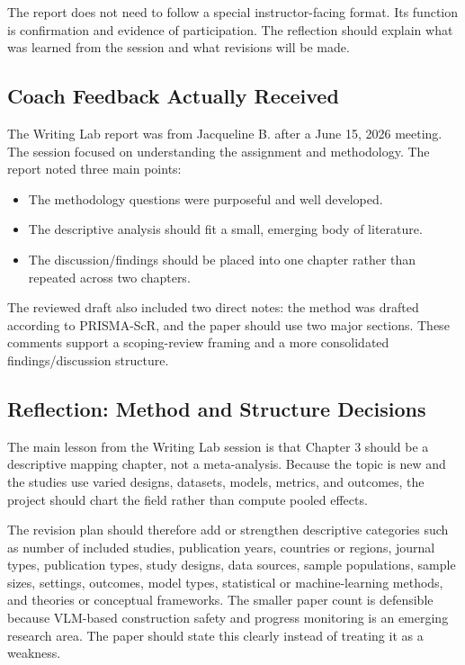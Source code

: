 \documentclass[10pt,letterpaper]{article}
\begin{document}
The report does not need to follow a special instructor-facing format. Its function is confirmation and evidence of participation. The reflection should explain what was learned from the session and what revisions will be made.

\subsection{Coach Feedback Actually Received}

The Writing Lab report was from Jacqueline B. after a June 15, 2026 meeting. The session focused on understanding the assignment and methodology. The report noted three main points:

\begin{itemize}
\item The methodology questions were purposeful and well developed.
\item The descriptive analysis should fit a small, emerging body of literature.
\item The discussion/findings should be placed into one chapter rather than repeated across two chapters.
\end{itemize}

The reviewed draft also included two direct notes: the method was drafted according to PRISMA-ScR, and the paper should use two major sections. These comments support a scoping-review framing and a more consolidated findings/discussion structure.

\subsection{Reflection: Method and Structure Decisions}

The main lesson from the Writing Lab session is that Chapter 3 should be a descriptive mapping chapter, not a meta-analysis. Because the topic is new and the studies use varied designs, datasets, models, metrics, and outcomes, the project should chart the field rather than compute pooled effects.

The revision plan should therefore add or strengthen descriptive categories such as number of included studies, publication years, countries or regions, journal types, publication types, study designs, data sources, sample populations, sample sizes, settings, outcomes, model types, statistical or machine-learning methods, and theories or conceptual frameworks. The smaller paper count is defensible because VLM-based construction safety and progress monitoring is an emerging research area. The paper should state this clearly instead of treating it as a weakness.
\end{document}
